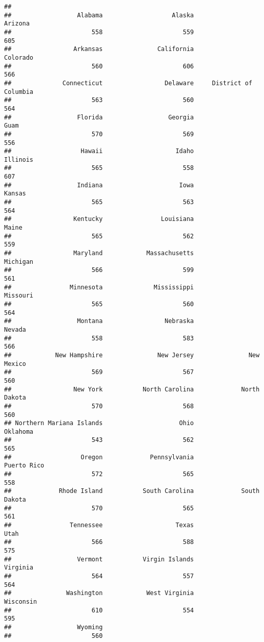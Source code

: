 \documentclass[
]{article}
\begin{document}
\begin{verbatim}
## 
##                  Alabama                   Alaska                  Arizona 
##                      558                      559                      605 
##                 Arkansas               California                 Colorado 
##                      560                      606                      566 
##              Connecticut                 Delaware     District of Columbia 
##                      563                      560                      564 
##                  Florida                  Georgia                     Guam 
##                      570                      569                      556 
##                   Hawaii                    Idaho                 Illinois 
##                      565                      558                      607 
##                  Indiana                     Iowa                   Kansas 
##                      565                      563                      564 
##                 Kentucky                Louisiana                    Maine 
##                      565                      562                      559 
##                 Maryland            Massachusetts                 Michigan 
##                      566                      599                      561 
##                Minnesota              Mississippi                 Missouri 
##                      565                      560                      564 
##                  Montana                 Nebraska                   Nevada 
##                      558                      583                      566 
##            New Hampshire               New Jersey               New Mexico 
##                      569                      567                      560 
##                 New York           North Carolina             North Dakota 
##                      570                      568                      560 
## Northern Mariana Islands                     Ohio                 Oklahoma 
##                      543                      562                      565 
##                   Oregon             Pennsylvania              Puerto Rico 
##                      572                      565                      558 
##             Rhode Island           South Carolina             South Dakota 
##                      570                      565                      561 
##                Tennessee                    Texas                     Utah 
##                      566                      588                      575 
##                  Vermont           Virgin Islands                 Virginia 
##                      564                      557                      564 
##               Washington            West Virginia                Wisconsin 
##                      610                      554                      595 
##                  Wyoming 
##                      560
\end{verbatim}
\end{document}
